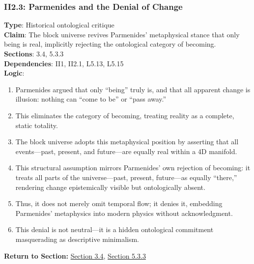 \documentclass[12pt]{book}
\begin{document}
\subsubsection*{II2.3: Parmenides and the Denial of Change}
\label{appendix:II2.3}
\textbf{Type}: Historical ontological critique\\
\textbf{Claim}: The block universe revives Parmenides' metaphysical stance that only being is real, implicitly rejecting the ontological category of becoming.\\
\textbf{Sections}: 3.4, 5.3.3\\
\textbf{Dependencies}: II1, II2.1, L5.13, L5.15\\
\textbf{Logic}:
\begin{enumerate}
    \item Parmenides argued that only ``being'' truly is, and that all apparent change is illusion: nothing can ``come to be'' or ``pass away.''
    \item This eliminates the category of becoming, treating reality as a complete, static totality.
    \item The block universe adopts this metaphysical position by asserting that all events---past, present, and future---are equally real within a 4D manifold.
    \item This structural assumption mirrors Parmenides' own rejection of becoming: it treats all parts of the universe---past, present, future---as equally ``there,'' rendering change epistemically visible but ontologically absent.
    \item Thus, it does not merely omit temporal flow; it denies it, embedding Parmenides' metaphysics into modern physics without acknowledgment.
    \item This denial is not neutral---it is a hidden ontological commitment masquerading as descriptive minimalism.
\end{enumerate}
\textbf{Return to Section:} \hyperref[sec:3.4]{Section 3.4}, \hyperref[sec:5.3.3]{Section 5.3.3}
\end{document}

